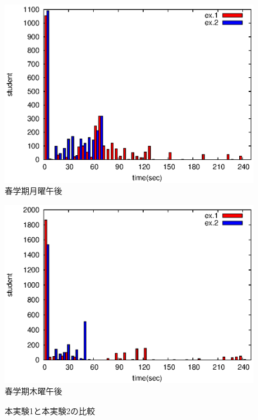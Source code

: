 \documentclass[a4paper,10pt]{jarticle}
\begin{document}
\begin{figure}[htpb]                        
\begin{minipage} {0.5\hsize}                             
\begin{center}                              
\includegraphics[bb=0 0 390 248,clip,width=\hsize]{omonagahist.eps}   
春学期月曜午後
\end{center}                                    
\end{minipage}                                 
\begin{minipage}{0.5\hsize}                                            
\begin{center}                              
\includegraphics[bb=0 0 390 248,clip,width=\hsize]{otherhist.eps}   
春学期木曜午後
\end{center}                                    
\end{minipage}                                 
\caption{本実験1と本実験2の比較}                              
\label{hikakusiyo}                                
\end{figure}                                 
\end{document}
